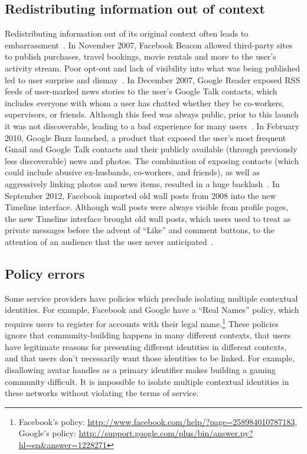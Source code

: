 \documentclass[10pt, conference, compsocconf]{IEEEtran}
\begin{document}
\subsection{Redistributing information out of context}
Redistributing information out of its original context often leads to
embarrassment~\cite{nissenbaum}.  In November 2007, Facebook Beacon allowed
third-party sites to publish purchases, travel bookings, movie rentals and more
to the user's activity stream.  Poor opt-out and lack of visibility
into what was being published led to user surprise and dismay~\cite{mccarthy,nakashima}.  In December 2007, Google Reader exposed
RSS feeds of user-marked news stories to the user's Google Talk contacts, which
includes everyone with whom a user has chatted whether they be co-workers,
supervisors, or friends. Although this feed was always public, prior to this
launch it was not discoverable, leading to a bad experience for many
users~\cite{helft}. In February 2010, Google Buzz launched, a product that
exposed the user's most frequent Gmail and Google Talk contacts and their
publicly available (through previously less discoverable) news and photos.  The
combination of exposing contacts (which could include abusive ex-husbands,
co-workers, and friends), as well as aggressively linking photos and news
items, resulted in a huge backlash~\cite{fugitivus,buzz}. In September 2012,
Facebook imported old wall posts from 2008 into the new Timeline interface.
Although wall posts were always visible from profile pages, the new Timeline
interface brought old wall posts, which users used to treat as private messages
before the advent of ``Like'' and comment buttons, to the attention of an
audience that the user never anticipated~\cite{timeline}.

\subsection{Policy errors}
\label{sec:policies}
Some service providers have policies which preclude isolating multiple
contextual identities. For example, Facebook and Google have a ``Real Names''
policy, which requires users to register for accounts with their legal
name.\footnote{Facebook's policy: \url{http://www.facebook.com/help/?page=258984010787183}, Google's policy: \url{http://support.google.com/plus/bin/answer.py?hl=en&answer=1228271}}
These policies ignore that
community-building happens in many different contexts, that users have
legitimate reasons for presenting different identities in different contexts,
and that users don't necessarily want those identities to be linked. For
example, disallowing avatar handles as a primary identifier makes building a
gaming community difficult. %
It is impossible to isolate multiple contextual identities in these networks
without violating the terms of service.
\end{document}

